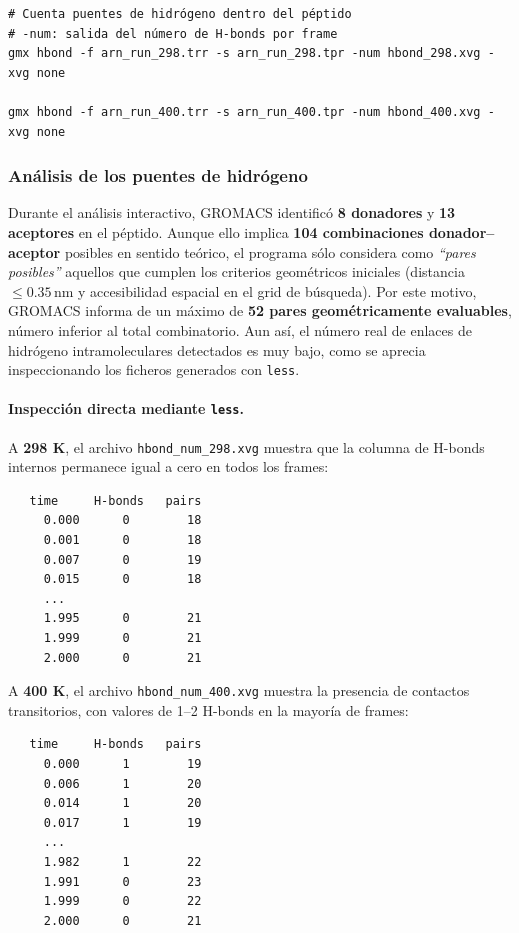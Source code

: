 \documentclass[12pt,a4paper]{article}
\begin{document}
\begin{lstlisting}[style=bashstyle]
# Cuenta puentes de hidrógeno dentro del péptido
# -num: salida del número de H-bonds por frame
gmx hbond -f arn_run_298.trr -s arn_run_298.tpr -num hbond_298.xvg -xvg none

gmx hbond -f arn_run_400.trr -s arn_run_400.tpr -num hbond_400.xvg -xvg none
\end{lstlisting}

\subsubsection*{Análisis de los puentes de hidrógeno}

Durante el análisis interactivo, GROMACS identificó \textbf{8 donadores} y \textbf{13 aceptores} en el péptido. 
Aunque ello implica \textbf{104 combinaciones donador–aceptor} posibles en sentido teórico, 
el programa sólo considera como \emph{“pares posibles”} aquellos que cumplen los criterios 
geométricos iniciales (distancia \(\leq 0.35\,\mathrm{nm}\) y accesibilidad espacial en el grid de búsqueda). 
Por este motivo, GROMACS informa de un máximo de \textbf{52 pares geométricamente evaluables}, 
número inferior al total combinatorio. Aun así, el número real de enlaces de hidrógeno intramoleculares detectados 
es muy bajo, como se aprecia inspeccionando los ficheros generados con \texttt{less}.

\paragraph*{Inspección directa mediante \texttt{less}.}

A \textbf{298 K}, el archivo \texttt{hbond\_num\_298.xvg} muestra que la columna de H-bonds internos permanece
igual a cero en todos los frames:

\begin{verbatim}
   time     H-bonds   pairs
     0.000      0        18
     0.001      0        18
     0.007      0        19
     0.015      0        18
     ...
     1.995      0        21
     1.999      0        21
     2.000      0        21
\end{verbatim}

A \textbf{400 K}, el archivo \texttt{hbond\_num\_400.xvg} muestra la presencia de contactos transitorios,
con valores de 1–2 H-bonds en la mayoría de frames:

\begin{verbatim}
   time     H-bonds   pairs
     0.000      1        19
     0.006      1        20
     0.014      1        20
     0.017      1        19
     ...
     1.982      1        22
     1.991      0        23
     1.999      0        22
     2.000      0        21
\end{verbatim}
\end{document}
